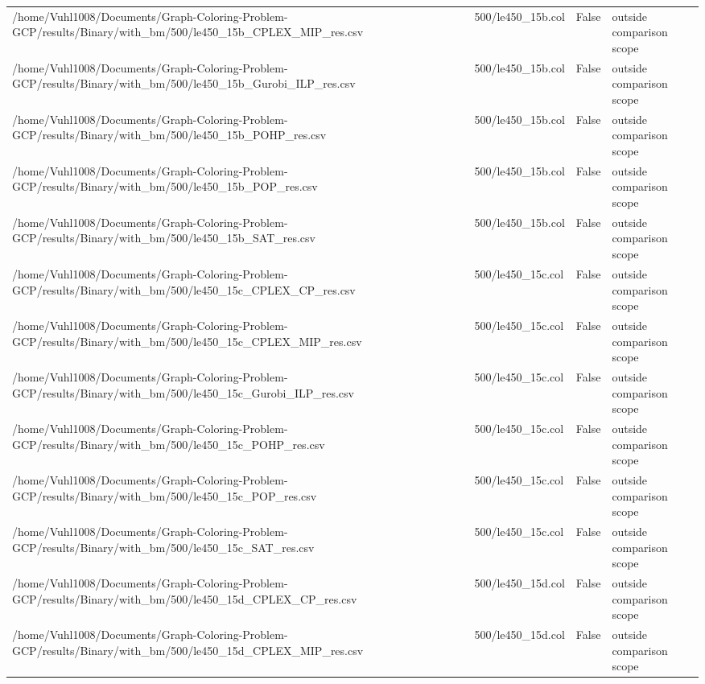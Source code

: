 \begin{table}[htbp]
\begin{tabular}{llll}
/home/Vuhl1008/Documents/Graph-Coloring-Problem-GCP/results/Binary/with\_bm/500/le450\_15b\_CPLEX\_MIP\_res.csv & 500/le450\_15b.col & False & outside comparison scope \\
/home/Vuhl1008/Documents/Graph-Coloring-Problem-GCP/results/Binary/with\_bm/500/le450\_15b\_Gurobi\_ILP\_res.csv & 500/le450\_15b.col & False & outside comparison scope \\
/home/Vuhl1008/Documents/Graph-Coloring-Problem-GCP/results/Binary/with\_bm/500/le450\_15b\_POHP\_res.csv & 500/le450\_15b.col & False & outside comparison scope \\
/home/Vuhl1008/Documents/Graph-Coloring-Problem-GCP/results/Binary/with\_bm/500/le450\_15b\_POP\_res.csv & 500/le450\_15b.col & False & outside comparison scope \\
/home/Vuhl1008/Documents/Graph-Coloring-Problem-GCP/results/Binary/with\_bm/500/le450\_15b\_SAT\_res.csv & 500/le450\_15b.col & False & outside comparison scope \\
/home/Vuhl1008/Documents/Graph-Coloring-Problem-GCP/results/Binary/with\_bm/500/le450\_15c\_CPLEX\_CP\_res.csv & 500/le450\_15c.col & False & outside comparison scope \\
/home/Vuhl1008/Documents/Graph-Coloring-Problem-GCP/results/Binary/with\_bm/500/le450\_15c\_CPLEX\_MIP\_res.csv & 500/le450\_15c.col & False & outside comparison scope \\
/home/Vuhl1008/Documents/Graph-Coloring-Problem-GCP/results/Binary/with\_bm/500/le450\_15c\_Gurobi\_ILP\_res.csv & 500/le450\_15c.col & False & outside comparison scope \\
/home/Vuhl1008/Documents/Graph-Coloring-Problem-GCP/results/Binary/with\_bm/500/le450\_15c\_POHP\_res.csv & 500/le450\_15c.col & False & outside comparison scope \\
/home/Vuhl1008/Documents/Graph-Coloring-Problem-GCP/results/Binary/with\_bm/500/le450\_15c\_POP\_res.csv & 500/le450\_15c.col & False & outside comparison scope \\
/home/Vuhl1008/Documents/Graph-Coloring-Problem-GCP/results/Binary/with\_bm/500/le450\_15c\_SAT\_res.csv & 500/le450\_15c.col & False & outside comparison scope \\
/home/Vuhl1008/Documents/Graph-Coloring-Problem-GCP/results/Binary/with\_bm/500/le450\_15d\_CPLEX\_CP\_res.csv & 500/le450\_15d.col & False & outside comparison scope \\
/home/Vuhl1008/Documents/Graph-Coloring-Problem-GCP/results/Binary/with\_bm/500/le450\_15d\_CPLEX\_MIP\_res.csv & 500/le450\_15d.col & False & outside comparison scope \\

\end{tabular}
\end{table}
